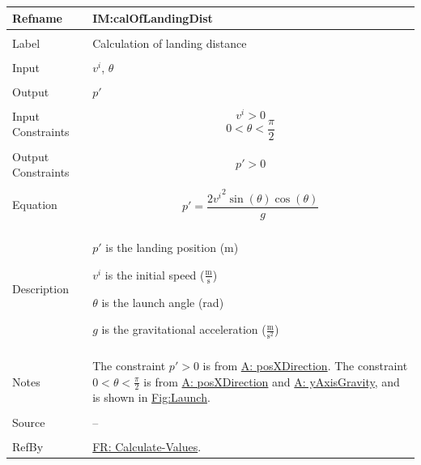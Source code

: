 \documentclass[12pt]{article}
\begin{document}
\noindent \begin{minipage}{\textwidth}
\begin{tabular}{p{} p{}}
\toprule \textbf{Refname} & \textbf{IM:calOfLandingDist}
\label{IM:calOfLandingDist}
\\ \midrule \\
Label & Calculation of landing distance
\\ \midrule \\
Input & ${v^{i}}$, $θ$
\\ \midrule \\
Output & $p'$
\\ \midrule \\
Input Constraints & \begin{displaymath}
                    {v^{i}}>0
                    \end{displaymath}
                    \begin{displaymath}
                    0<θ<\frac{π}{2}
                    \end{displaymath}
\\ \midrule \\
Output Constraints & \begin{displaymath}
                     p'>0
                     \end{displaymath}
\\ \midrule \\
Equation & \begin{displaymath}
           p'=\frac{2 {v^{i}}^{2} \sin\left(θ\right) \cos\left(θ\right)}{g}
           \end{displaymath}
\\ \midrule \\
Description & \begin{symbDescription}
              \item{$p'$ is the landing position (m)}
              \item{${v^{i}}$ is the initial speed ($\frac{\text{m}}{\text{s}}$)}
              \item{$θ$ is the launch angle (rad)}
              \item{$g$ is the gravitational acceleration ($\frac{\text{m}}{\text{s}^{2}}$)}
              \end{symbDescription}
\\ \midrule \\
Notes & The constraint $p'>0$ is from \hyperref[posXDirection]{A: posXDirection}.
        The constraint $0<θ<\frac{π}{2}$ is from \hyperref[posXDirection]{A: posXDirection} and \hyperref[yAxisGravity]{A: yAxisGravity}, and is shown in \hyperref[Figure:Launch]{Fig:Launch}.
\\ \midrule \\
Source & --
\\ \midrule \\
RefBy & \hyperref[calcValues]{FR: Calculate-Values}.
\\ \bottomrule \end{tabular}
\end{minipage}
\end{document}
